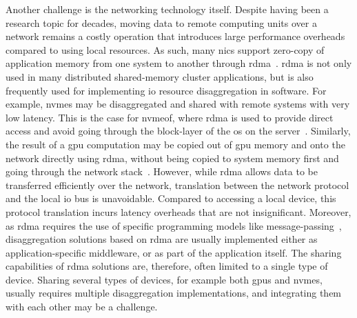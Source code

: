 Another challenge is the networking technology itself. 
%
Despite having been a research topic for decades, moving data to remote computing units over a network remains a costly operation that introduces large performance overheads compared to using local resources.
%
As such, many \glspl{nic} support zero-copy of application memory from one system to another through \gls{rdma}~\cite{Huang2012}.
%
\Gls{rdma} is not only used in many distributed shared-memory cluster applications, but is also frequently used for implementing \gls{io} resource \gls{disaggregation} in software.
%
For example, \glspl{nvme} may be \gls{disaggregated} and shared with remote systems with very low latency.
This is the case for \gls{nvmeof}, where \gls{rdma} is used to provide direct access and avoid going through the block-layer of the \gls{os} on the server~\cite{Guz2018}.
%
Similarly, the result of a \gls{gpu} computation may be copied out of \gls{gpu} memory and onto the network directly using \gls{rdma}, without being copied to system memory first and going through the network stack~\cite{Venkatesh2014}.
%
However, while \gls{rdma} allows data to be transferred efficiently over the network, translation between the network protocol and the local \gls{io} bus is unavoidable. 
%
Compared to accessing a local device, this protocol translation incurs latency overheads that are not insignificant.
%
Moreover, as \gls{rdma} requires the use of specific programming models like message-passing~\cite{Jiang2004}, \gls{disaggregation} solutions based on \gls{rdma} are usually implemented either as application-specific \gls{middleware}, or as part of the application itself.
%
The sharing capabilities of \gls{rdma} solutions are, therefore, often limited to a single type of device.
Sharing several types of devices, for example both \glspl{gpu} and \glspl{nvme}, usually requires multiple \gls{disaggregation} implementations, and integrating them with each other may be a challenge.



